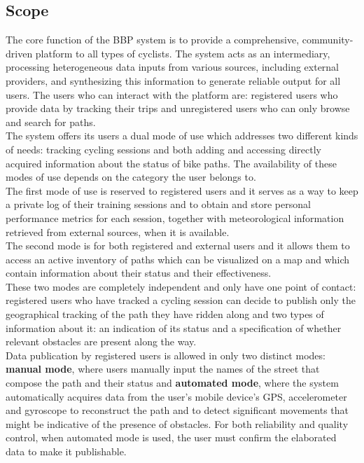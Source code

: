 \documentclass{article}
\begin{document}
\subsection{Scope}
The core function of the BBP system is to provide a comprehensive, community-driven platform to all types of cyclists. 
The system acts as an intermediary, processing heterogeneous data inputs from various sources, including external providers, and synthesizing this information to generate reliable output for all users. The users who can interact with the platform are: registered users who provide data by tracking their trips and unregistered users who can only browse and search for paths. \\
The system offers its users a dual mode of use which addresses two different kinds of needs: tracking cycling sessions and both adding and accessing directly acquired information about the status of bike paths. The availability of these modes of use depends on the category the user belongs to. \\
The first mode of use is reserved to registered users and it serves as a way to keep a private log of their training sessions and to obtain and store personal performance metrics for each session, together with meteorological information retrieved from external sources, when it is available. \\ The second mode is for both registered and external users and it allows them to access an active inventory of paths which can be visualized on a map and which contain information about their status and their effectiveness. \\ These two modes are completely independent and only have one point of contact: registered users who have tracked a cycling session can decide to publish only the geographical tracking of the path they have ridden along and two types of information about it: an indication of its status and a specification of whether relevant obstacles are present along the way. \\
Data publication by registered users is allowed in only two distinct modes: \textbf{manual mode}, where users manually input the names of the street that compose the path and their status and \textbf{automated mode}, where the system automatically acquires data from the user's mobile device's  GPS, accelerometer and gyroscope to reconstruct the path and to detect significant movements that might be indicative of the presence of obstacles. For both reliability and quality control, when automated mode is used, the user must confirm the elaborated data to make it publishable. \\
\end{document}
